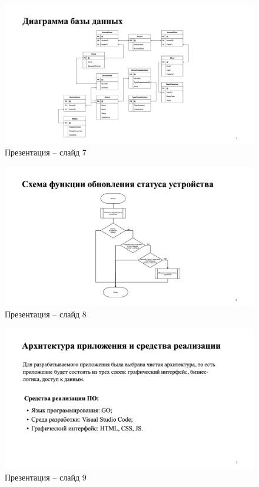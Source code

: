 \begin{figure}[H]
    \includegraphics[width=1\linewidth]{img/7.png}
    \caption{Презентация -- слайд 7}
\end{figure}
\noindent

\begin{figure}[H]
    \includegraphics[width=1\linewidth]{img/8.png}
    \caption{Презентация -- слайд 8}
\end{figure}
\noindent

\begin{figure}[H]
    \includegraphics[width=1\linewidth]{img/9.png}
    \caption{Презентация -- слайд 9}
\end{figure}
\noindent

